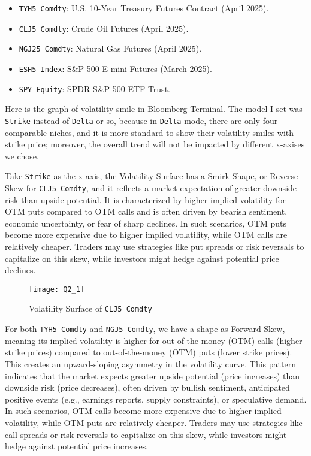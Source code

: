 \documentclass[letterpaper]{article}
\begin{document}
		\begin{itemize}
			\item \texttt{TYH5 Comdty}: U.S. 10-Year Treasury Futures Contract (April 2025).
			\item \texttt{CLJ5 Comdty}: Crude Oil Futures (April 2025).
			\item \texttt{NGJ25 Comdty}: Natural Gas Futures (April 2025).
			\item \texttt{ESH5 Index}: S\&P 500 E-mini Futures (March 2025).
			\item \texttt{SPY Equity}: SPDR S\&P 500 ETF Trust.
		\end{itemize}

		Here is the graph of volatility smile in Bloomberg Terminal. The model I set was \texttt{Strike} instead of \texttt{Delta} or so, because in \texttt{Delta} mode, there are only four comparable niches, and it is more standard to show their volatility smiles with strike price; moreover, the overall trend will not be impacted by different x-axises we chose.
		
		Take \texttt{Strike} as the x-axis, the Volatility Surface has a Smirk Shape, or Reverse Skew for \texttt{CLJ5 Comdty}, and it reflects a market expectation of greater downside risk than upside potential. It is characterized by higher implied volatility for OTM puts compared to OTM calls and is often driven by bearish sentiment, economic uncertainty, or fear of sharp declines. In such scenarios, OTM puts become more expensive due to higher implied volatility, while OTM calls are relatively cheaper. Traders may use strategies like put spreads or risk reversals to capitalize on this skew, while investors might hedge against potential price declines. 
		
		\begin{figure}
			\caption{Volatility Surface of \texttt{CLJ5 Comdty}}
			\centering
			\texttt{[image: Q2\_1]}
		\end{figure}
	
	For both \texttt{TYH5 Comdty} and \texttt{NGJ5 Comdty}, we have a shape as Forward Skew, meaning its implied volatility is higher for out-of-the-money (OTM) calls (higher strike prices) compared to out-of-the-money (OTM) puts (lower strike prices). This creates an upward-sloping asymmetry in the volatility curve. This pattern indicates that the market expects greater upside potential (price increases) than downside risk (price decreases), often driven by bullish sentiment, anticipated positive events (e.g., earnings reports, supply constraints), or speculative demand. In such scenarios, OTM calls become more expensive due to higher implied volatility, while OTM puts are relatively cheaper. Traders may use strategies like call spreads or risk reversals to capitalize on this skew, while investors might hedge against potential price increases. 
	
\end{document}
